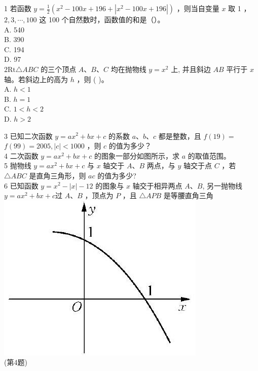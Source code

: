 \documentclass[10pt]{article}
\begin{document}
1 若函数 $y=\frac{1}{2}\left(x^{2}-100 x+196+\left|x^{2}-100 x+196\right|\right)$ ，则当自变量 $x$ 取 1 ， $2,3, \cdots, 100$ 这 100 个自然数时，函数值的和是（）。\\
A. 540\\
B. 390\\
C. 194\\
D. 97\\
$2 \mathrm{Rt} \triangle A B C$ 的三个顶点 $A 、 B 、 C$ 均在抛物线 $y=x^{2}$ 上, 并且斜边 $A B$ 平行于 $x$ 轴。若斜边上的高为 $h$ ，则 ( )。\\
A. $h<1$\\
B. $h=1$\\
C. $1<h<2$\\
D. $h>2$

3 已知二次函数 $y=a x^{2}+b x+c$ 的系数 $a 、 b 、 c$ 都是整数，且 $f(19)=$ $f(99)=2005,|c|<1000$ ，则 $c$ 的值为多少？\\
4 二次函数 $y=a x^{2}+b x+c$ 的图象一部分如图所示，求 $a$ 的取值范围。\\
5 抛物线 $y=a x^{2}+b x+c$ 与 $x$ 轴交于 $A 、 B$ 两点，与 $y$ 轴交于点 $C$ ，若 $\triangle A B C$ 是直角三角形，则 $a c$ 的值为多少?\\
6 已知函数 $y=x^{2}-|x|-12$ 的图象与 $x$ 轴交于相异两点 $A 、 B$, 另一抛物线 $y=a x^{2}+b x+c$过 $A 、 B$ ，顶点为 $P$ ，且 $\triangle A P B$ 是等腰直角三角\\
\includegraphics[max width=\textwidth, center]{2024_10_30_1bf34f7aeb61f11d11d3g-040(1)}\\
(第4题)
\end{document}
